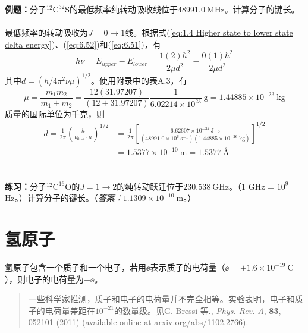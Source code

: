     \begin{examplebox}
        \textbf{例题：}分子$^{12}\mathrm{C}^{32}\mathrm{S}$的最低频率纯转动吸收线位于$48991.0 \: \mathrm{MHz}$。计算分子的键长。
        \\
        \\
        最低频率的转动吸收为$J = 0 \to 1$线。根据式(\ref{eq:1.4 Higher state to lower state delta energy})、(\ref{eq:6.52})和(\ref{eq:6.51})，有
        \begin{equation*}
            h\nu = E_{upper} - E_{lower} = \frac{1\left(2\right)\hbar^2}{2\mu d^2} - \frac{0\left(1\right)\hbar^2}{2\mu d^2}
        \end{equation*}
        其中$d = \left(h/4\pi^2\nu\mu\right)^{1/2}$。使用附录中的表A.3，有
        \begin{equation*}
            \mu = \frac{m_1m_2}{m_1 + m_2} = \frac{12\left(31.97207\right)}{\left(12+31.97207\right)}\frac{1}{6.02214\times 10^{23}} \: \mathrm{g} = 1.44885 \times 10^{-23} \: \mathrm{kg}
        \end{equation*}
        质量的国际单位为千克，则
        \begin{equation*}
            \begin{aligned}
                d = \frac{1}{2\pi}\left(\frac{h}{\nu_{0 \to 1}\mu}\right)^{1/2} & = \frac{1}{2\pi}\left[\frac{6.62607 \times 10^{-34} \: \mathrm{J \cdot s}}{\left(48991.0 \times 10^6\: \mathrm{s}^{-1}\right) \left(1.44885 \times 10^{-26} \: \mathrm{kg}\right)}\right]^{1/2} \\
                & = 1.5377 \times 10^{-10} \: \mathrm{m} = 1.5377 \: \mathrm{Å}
            \end{aligned}
        \end{equation*}
        \\
        \\
        \textbf{练习：}分子$^{12}\mathrm{C}^{16}\mathrm{O}$的$J = 1 \to 2$的纯转动跃迁位于$230.538 \: \mathrm{GHz}$。（1 GHz = $10^9$ Hz。）计算分子的键长。（\textit{答案：}$1.1309 \times 10^{-10} \: \mathrm{m}$。）
    \end{examplebox}

\section{氢原子}
\label{sec:6.5 The Hydrogen Atom}
    氢原子包含一个质子和一个电子，若用$\ee $表示质子的电荷量（$\ee = + 1.6 \times 10^{-19} \: \mathrm{C}$），则电子的电荷量为$-\ee $。
    \begin{quote}
        \small
        一些科学家推测，质子和电子的电荷量并不完全相等。实验表明，电子和质子的电荷量差距在$10^{-21}$的数量级。见G. Bressi 等., \textit{Phys. Rev. A}, \textbf{83}, 052101 (2011) (available online at arxiv.org/abs/1102.2766).
    \end{quote}

